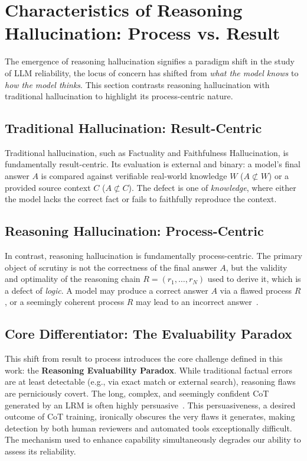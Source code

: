 \vspace{-2mm}\section{Characteristics of Reasoning Hallucination: Process vs. Result}\vspace{-1mm}
\label{sec:characteristics}

The emergence of reasoning hallucination signifies a paradigm shift in the study of LLM reliability, the locus of concern has shifted from \textit{what the model knows} to \textit{how the model thinks}.
This section contrasts reasoning hallucination with traditional hallucination to highlight its process-centric nature.

\subsection{Traditional Hallucination: Result-Centric}

Traditional hallucination, such as Factuality and Faithfulness Hallucination, is fundamentally result-centric.
Its evaluation is external and binary: a model's final answer $A$ is compared against verifiable real-world knowledge $W$ ($A \not\subset W$) or a provided source context $C$ ($A \not\subset C$).
The defect is one of \textit{knowledge}, where either the model lacks the correct fact or fails to faithfully reproduce the context.

\subsection{Reasoning Hallucination: Process-Centric}

In contrast, reasoning hallucination is fundamentally process-centric.
The primary object of scrutiny is not the correctness of the final answer $A$, but the validity and optimality of the reasoning chain $R = (r_1, \dots, r_N)$ used to derive it, which is a defect of \textit{logic}.
A model may produce a correct answer $A$ via a flawed process $R$, or a seemingly coherent process $R$ may lead to an incorrect answer~\cite{joshi2024llms,yao2025reasoning,cuesta2025lrms}.

\subsection{Core Differentiator: The Evaluability Paradox}

This shift from result to process introduces the core challenge defined in this work: the \textbf{Reasoning Evaluability Paradox}.
While traditional factual errors are at least detectable (e.g., via exact match or external search), reasoning flaws are perniciously covert.
The long, complex, and seemingly confident CoT generated by an LRM is often highly persuasive~\cite{cheng2025chain}.
This persuasiveness, a desired outcome of CoT training, ironically obscures the very flaws it generates, making detection by both human reviewers and automated tools exceptionally difficult.
The mechanism used to enhance capability simultaneously degrades our ability to assess its reliability.
